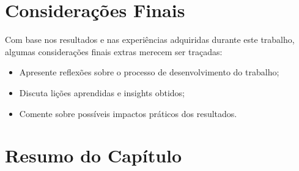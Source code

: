 \section{Considerações Finais}
\label{status-consideracoes-finais}
Com base nos resultados e nas experiências adquiridas durante este trabalho, algumas considerações finais extras merecem ser traçadas:

\begin{itemize}
\item Apresente reflexões sobre o processo de desenvolvimento do trabalho;
\item Discuta lições aprendidas e insights obtidos;
\item Comente sobre possíveis impactos práticos dos resultados.
\end{itemize}

\section{Resumo do Capítulo}
\label{status-resumo}
